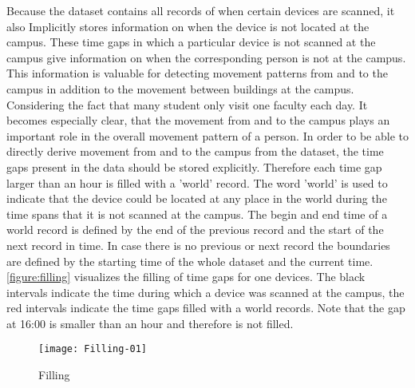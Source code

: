 Because the dataset contains all records of when certain devices are scanned, it also Implicitly stores information on when the device is not located at the campus. These time gaps in which a particular device is not scanned at the campus give information on when the corresponding person is not at the campus. This information is valuable for detecting movement patterns from and to the campus in addition to the movement between buildings at the campus. Considering the fact that many student only visit one faculty each day. It becomes especially clear, that the movement from and to the campus plays an important role in the overall movement pattern of a person. In order to be able to directly derive movement from and to the campus from the dataset, the time gaps present in the data should be stored explicitly. Therefore each time gap larger than an hour is filled with a 'world' record. The word 'world' is used to indicate that the device could be located at any place in the world during the time spans that it is not scanned at the campus. The begin and end time of a world record is defined by the end of the previous record and the start of the next record in time. In case there is no previous or next record the boundaries are defined by the starting time of the whole dataset and the current time. \autoref{figure:filling} visualizes the filling of time gaps for one devices. The black intervals indicate the time during which a device was scanned at the campus, the red intervals indicate the time gaps filled with a world records. Note that the gap at 16:00  is smaller than an hour and therefore is not filled.
\begin{figure}[H]
\centering
\texttt{[image: Filling-01]}
\captionsetup{justification=centering}
\caption{Filling}
\label{figure:filling}
\end{figure}

